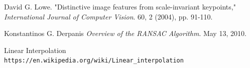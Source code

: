 \documentclass[12pt,journal,compsoc]{IEEEtran}
\begin{document}
\ifCLASSOPTIONcaptionsoff
  \newpage
\fi





%
%
%



% 




\begin{thebibliography}{9}
David G. Lowe.
"Distinctive image features from scale-invariant keypoints,"
\textit{International Journal of Computer Vision}. 
60, 2 (2004), pp. 91-110.
 
Konstantinos G. Derpanis
\textit{Overview of the RANSAC Algorithm}.
May 13, 2010.
 
Linear Interpolation
\\\texttt{https://en.wikipedia.org/wiki/Linear\_interpolation}
\end{thebibliography}







\end{document}
